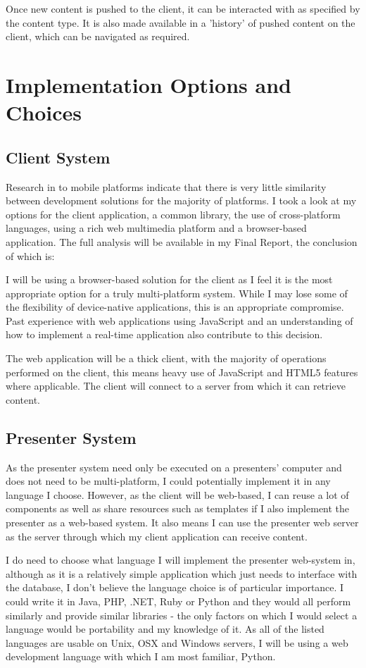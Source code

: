 \documentclass[a4papert,11pt,notitlepage]{ltxdoc}
\begin{document}
Once new content is pushed to the client, it can be interacted with as specified by the content type. It is also made available in a 'history' of pushed content on the client, which can be navigated as required.

\section{Implementation Options and Choices}
\subsection{Client System}
Research in to mobile platforms indicate that there is very little similarity between development solutions for the majority of platforms. I took a look at my options for the client application, a common library, the use of cross-platform languages, using a rich web multimedia platform and a browser-based application. The full analysis will be available in my Final Report, the conclusion of which is:

I will be using a browser-based solution for the client as I feel it is the most appropriate option for a truly multi-platform system. While I may lose some of the flexibility of device-native applications, this is an appropriate compromise. Past experience with web applications using JavaScript and an understanding of how to implement a real-time application also contribute to this decision.

The web application will be a thick client, with the majority of operations performed on the client, this means heavy use of JavaScript and HTML5 features where applicable. The client will connect to a server from which it can retrieve content.

\subsection{Presenter System}
As the presenter system need only be executed on a presenters' computer and does not need to be multi-platform, I could potentially implement it in any language I choose. However, as the client will be web-based, I can reuse a lot of components as well as share resources such as templates if I also implement the presenter as a web-based system. It also means I can use the presenter web server as the server through which my client application can receive content.

I do need to choose what language I will implement the presenter web-system in, although as it is a relatively simple application which just needs to interface with the database, I don't believe the language choice is of particular importance. I could write it in Java, PHP, .NET, Ruby or Python and they would all perform similarly and provide similar libraries - the only factors on which I would select a language would be portability and my knowledge of it. As all of the listed languages are usable on Unix, OSX and Windows servers, I will be using a web development language with which I am most familiar, Python.
\end{document}
